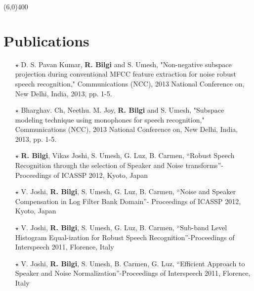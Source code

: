 \documentclass[line,margin]{res}
\begin{document}
\begin{resume}
\line(6,0){400}

\normalsize
\section{Publications}
\label{pub}
\small
 \begin{itemize}
   \item[$\star$] D. S. Pavan Kumar, {\bf R. Bilgi} and S. Umesh, "Non-negative subspace projection during conventional MFCC feature extraction for noise robust speech recognition," Communications (NCC), 2013 National Conference on, New Delhi, India, 2013, pp. 1-5.
   \item[$\star$] Bharghav. Ch, Neethu. M. Joy, {\bf R. Bilgi} and S. Umesh, "Subspace modeling technique using monophones for speech recognition," Communications (NCC), 2013 National Conference on, New Delhi, India, 2013, pp. 1-5.
   \item[$\star$] {\bf R. Bilgi}, Vikas Joshi, S. Umesh, G. Luz, B. Carmen, “Robust Speech Recognition through the selection of Speaker and Noise transforms”- Proceedings of ICASSP 2012, Kyoto, Japan
   \item[$\star$] V. Joshi, {\bf R. Bilgi}, S. Umesh, G. Luz, B. Carmen, “Noise and Speaker Compensation in Log Filter Bank Domain”- Proceedings of ICASSP 2012, Kyoto, Japan
   \item[$\star$] V. Joshi, {\bf R. Bilgi}, S. Umesh, G. Luz, B. Carmen, “Sub-band Level Histogram Equal-ization for Robust Speech Recognition”-Proceedings of Interspeech 2011, Florence, Italy
   \item[$\star$] V. Joshi, {\bf R. Bilgi}, S. Umesh, B. Carmen, G. Luz, “Efficient Approach to Speaker and Noise Normalization”-Proceedings of Interspeech 2011, Florence, Italy

\end{itemize}
 


 
\normalsize
%   
%  
%  


\end{resume}
\end{document}
